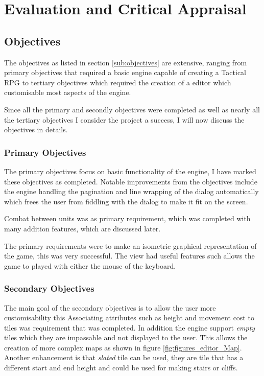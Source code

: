 \section{Evaluation and Critical Appraisal}

\subsection{Objectives}
\label{sub:eobjectives}
The objectives as listed in section \ref{sub:objectives}  are extensive, ranging from primary objectives that required a basic engine capable of creating a Tactical RPG to tertiary objectives which required the creation of a editor which customisable most aspects of the  engine. 

Since all the primary and secondly objectives were completed as well as nearly all the tertiary objectives I consider  the project a success, I will now discuss the objectives in details.

\subsubsection{Primary Objectives}

The primary objectives focus on basic functionality of the engine, I have marked these objectives as completed. Notable improvements from the objectives include the engine handling the pagination and line wrapping of the dialog automatically which frees the user from fiddling with the dialog to make it fit on the screen. 

Combat between units was as primary requirement, which was completed with many addition features, which are discussed later.

The primary requirements were to make an isometric graphical representation of the game, this was very successful. The view had useful features such allows the game to played with either the mouse of the keyboard.

\subsubsection{Secondary Objectives}
The main goal of the secondary objectives is to allow the user more customisability this   Associating attributes such as height and movement cost to tiles was requirement that was completed. In addition the engine support \emph{empty} tiles which they are impassable and not displayed to the user. This allows the creation of more complex maps as shown in figure \ref{fig:figures_editor_Map}. Another enhancement is that \emph{slated} tile can be used, they are tile that has a different start and end height and could be used for making stairs or cliffs. 


